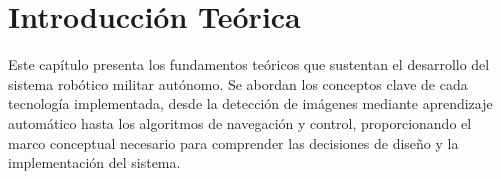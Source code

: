 \chapter{Introducción Teórica} %

\label{Chapter:Introducción Teórica} %
Este capítulo presenta los fundamentos teóricos que sustentan el desarrollo del sistema robótico militar autónomo. Se abordan los conceptos clave de cada tecnología implementada, desde la detección de imágenes mediante aprendizaje automático hasta los algoritmos de navegación y control, proporcionando el marco conceptual necesario para comprender las decisiones de diseño y la implementación del sistema.



